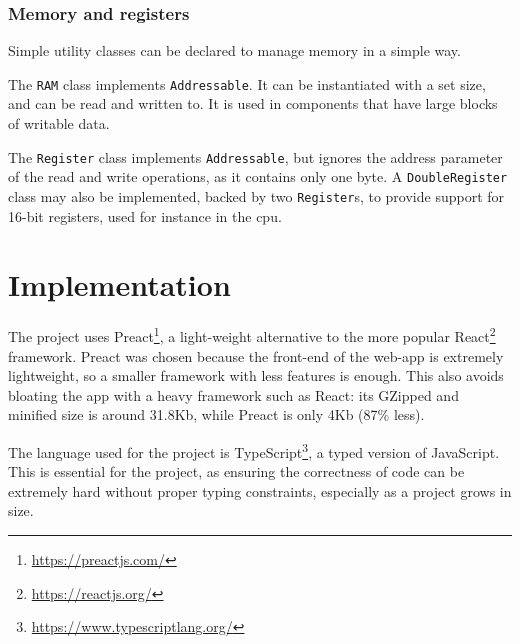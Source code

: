 \documentclass[11pt]{report}
\newcommand{\ftnt}[1]{\footnote{\url{#1}}}
\begin{document}
\subsection{Memory and registers}

Simple utility classes can be declared to manage memory in a simple way.

The \texttt{RAM} class implements \texttt{Addressable}. It can be instantiated with a set size, and can be read and written to. It is used in components that have large blocks of writable data.

The \texttt{Register} class implements \texttt{Addressable}, but ignores the address parameter of the read and write operations, as it contains only one byte. A \texttt{DoubleRegister} class may also be implemented, backed by two \texttt{Register}s, to provide support for 16-bit registers, used for instance in the \gls{cpu}.

\chapter{Implementation}

The project uses Preact\ftnt{https://preactjs.com/}, a light-weight alternative to the more popular React\ftnt{https://reactjs.org/} framework. Preact was chosen because the front-end of the web-app is extremely lightweight, so a smaller framework with less features is enough. This also avoids bloating the app with a heavy framework such as React: its GZipped and minified size is around 31.8Kb, while Preact is only 4Kb (87\% less).

The language used for the project is TypeScript\ftnt{https://www.typescriptlang.org/}, a typed version of JavaScript. This is essential for the project, as ensuring the correctness of code can be extremely hard without proper typing constraints, especially as a project grows in size.
\end{document}
